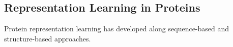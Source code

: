 \documentclass[sigconf]{acmart}
\begin{document}




\subsection{Representation Learning in Proteins}
Protein representation learning has developed along sequence-based and structure-based approaches.
\end{document}

